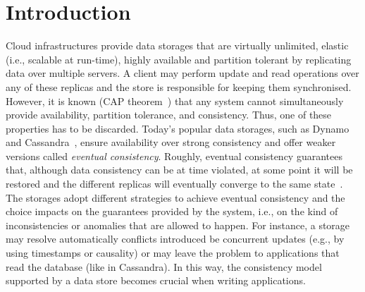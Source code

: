 
\section{Introduction}

Cloud infrastructures provide data storages that are virtually unlimited, elastic (i.e., scalable at run-time), 
highly available and partition tolerant by 
replicating data over multiple servers. A client may perform update and 
read operations over any of these replicas and the  store is responsible for keeping 
them synchronised. 
However, it is known (CAP theorem~\cite{CAP}) that any system cannot simultaneously provide availability, 
partition tolerance, and consistency. Thus, 
one of these properties has to be discarded. Today's popular 
data storages, such as Dynamo~\cite{DeCandia:2007:DAH:1294261.1294281} and  Cassandra~\cite{lakshman2010cassandra}, ensure 
availability over strong consistency and offer weaker versions called \emph{eventual consistency}.
Roughly, eventual consistency guarantees that, although data consistency can be at time violated, at some point it will be restored
and the different replicas will eventually converge to the same state~\cite{DBLP:journals/cacm/BailisG13}.
The  storages adopt different strategies to achieve eventual consistency and the choice  
impacts on the  guarantees provided by the system, i.e., on the kind of 
inconsistencies or anomalies that are allowed to happen. For instance, a storage may
resolve automatically conflicts introduced be concurrent updates (e.g., by using timestamps or causality) or  
may leave the problem to applications that read the database (like in Cassandra).
In this way, the consistency model supported by a data store becomes crucial when writing applications. 

